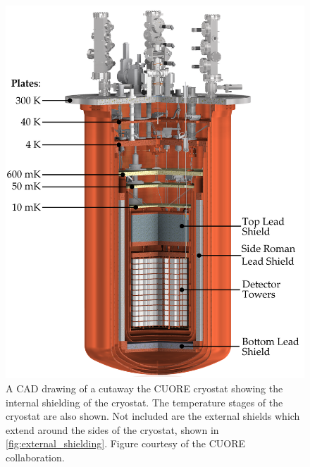 \begin{figure}[htbp]
\centering
\includegraphics[width=\linewidth]{Figures/cryostat_Adjusted.png}
\caption[CAD cutaway of the CUORE cryostat]
{A CAD drawing of a cutaway the CUORE cryostat showing the internal shielding of the cryostat.
The temperature stages of the cryostat are also shown.
Not included are the external shields which extend around the sides of the cryostat, shown in \autoref{fig:external_shielding}.
Figure courtesy of the CUORE collaboration.}
\label{fig:cryostat_cad_cutout}
\end{figure}

